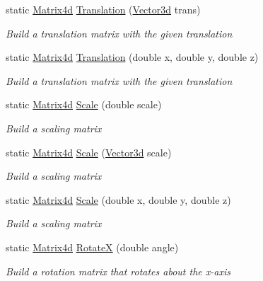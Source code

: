 \begin{DoxyCompactItemize}
static \hyperlink{struct_open_t_k_1_1_matrix4d}{Matrix4d} \hyperlink{struct_open_t_k_1_1_matrix4d_af0c7c3a98b4ebbda97d385e1a2bb00f4}{Translation} (\hyperlink{struct_open_t_k_1_1_vector3d}{Vector3d} trans)
\begin{DoxyCompactList}\small\item\em Build a translation matrix with the given translation \end{DoxyCompactList}\item 
static \hyperlink{struct_open_t_k_1_1_matrix4d}{Matrix4d} \hyperlink{struct_open_t_k_1_1_matrix4d_aa91932065c5a5efdfad0dd8057288bf0}{Translation} (double x, double y, double z)
\begin{DoxyCompactList}\small\item\em Build a translation matrix with the given translation \end{DoxyCompactList}\item 
static \hyperlink{struct_open_t_k_1_1_matrix4d}{Matrix4d} \hyperlink{struct_open_t_k_1_1_matrix4d_aead4bc6c5cf4106ebe21c7db85ab381e}{Scale} (double scale)
\begin{DoxyCompactList}\small\item\em Build a scaling matrix \end{DoxyCompactList}\item 
static \hyperlink{struct_open_t_k_1_1_matrix4d}{Matrix4d} \hyperlink{struct_open_t_k_1_1_matrix4d_ac70c8864ba7d48092c2fe99f4c711562}{Scale} (\hyperlink{struct_open_t_k_1_1_vector3d}{Vector3d} scale)
\begin{DoxyCompactList}\small\item\em Build a scaling matrix \end{DoxyCompactList}\item 
static \hyperlink{struct_open_t_k_1_1_matrix4d}{Matrix4d} \hyperlink{struct_open_t_k_1_1_matrix4d_a5f0fdae42fb0e936fe2d8be0706362b0}{Scale} (double x, double y, double z)
\begin{DoxyCompactList}\small\item\em Build a scaling matrix \end{DoxyCompactList}\item 
static \hyperlink{struct_open_t_k_1_1_matrix4d}{Matrix4d} \hyperlink{struct_open_t_k_1_1_matrix4d_a984e5c4c3700b2c3bd16f0d0d8da5622}{Rotate\-X} (double angle)
\begin{DoxyCompactList}\small\item\em Build a rotation matrix that rotates about the x-\/axis \end{DoxyCompactList}\item 

\end{DoxyCompactItemize}
